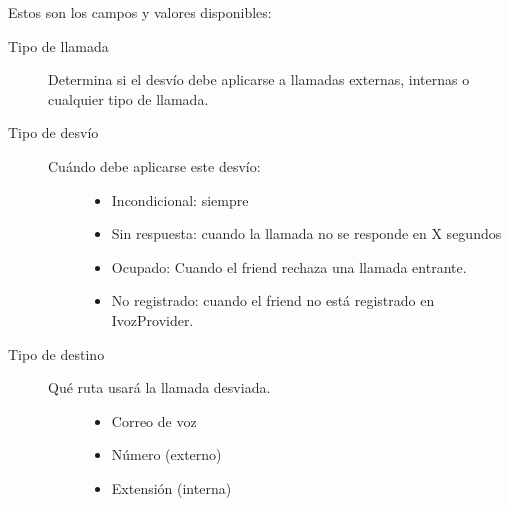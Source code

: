 \documentclass[letterpaper,10pt,spanish]{sphinxmanual}
\begin{document}
Estos son los campos y valores disponibles:
\begin{description}
\item[{Tipo de llamada}] \leavevmode{}\label{administration_portal/client/vpbx/routing_endpoints/friends/index:term-call-type}
Determina si el desvío debe aplicarse a llamadas externas, internas o cualquier tipo de llamada.

\item[{Tipo de desvío}] \leavevmode{}\label{administration_portal/client/vpbx/routing_endpoints/friends/index:term-forward-type}\begin{description}
\item[{Cuándo debe aplicarse este desvío:}] \leavevmode\begin{itemize}
\item {} 
Incondicional: siempre

\item {} 
Sin respuesta: cuando la llamada no se responde en X segundos

\item {} 
Ocupado: Cuando el friend rechaza una llamada entrante.

\item {} 
No registrado: cuando el friend no está registrado en IvozProvider.

\end{itemize}

\end{description}

\item[{Tipo de destino}] \leavevmode{}\label{administration_portal/client/vpbx/routing_endpoints/friends/index:term-target-type}\begin{description}
\item[{Qué ruta usará la llamada desviada.}] \leavevmode\begin{itemize}
\item {} 
Correo de voz

\item {} 
Número (externo)

\item {} 
Extensión (interna)

\end{itemize}

\end{description}

\end{description}
\end{document}
